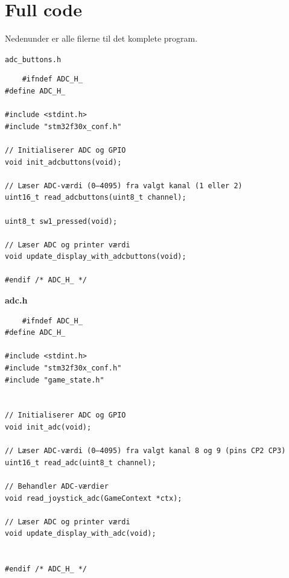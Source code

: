 \section{Full code}
\label{sec:fullcode}

Nedenunder er alle filerne til det komplete program.

\texttt{adc\_buttons.h}
\begin{lstlisting}
    #ifndef ADC_H_
#define ADC_H_

#include <stdint.h>
#include "stm32f30x_conf.h"

// Initialiserer ADC og GPIO
void init_adcbuttons(void);

// Læser ADC-værdi (0–4095) fra valgt kanal (1 eller 2)
uint16_t read_adcbuttons(uint8_t channel);

uint8_t sw1_pressed(void);

// Læser ADC og printer værdi
void update_display_with_adcbuttons(void);

#endif /* ADC_H_ */
\end{lstlisting}

\textbf{adc.h}
\begin{lstlisting}
    #ifndef ADC_H_
#define ADC_H_

#include <stdint.h>
#include "stm32f30x_conf.h"
#include "game_state.h"


// Initialiserer ADC og GPIO
void init_adc(void);

// Læser ADC-værdi (0–4095) fra valgt kanal 8 og 9 (pins CP2 CP3) 
uint16_t read_adc(uint8_t channel);

// Behandler ADC-værdier
void read_joystick_adc(GameContext *ctx);

// Læser ADC og printer værdi
void update_display_with_adc(void);


#endif /* ADC_H_ */
\end{lstlisting}

